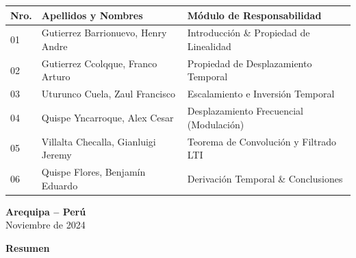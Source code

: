 \documentclass[11pt,a4paper]{article}
\begin{document}
\begin{titlepage}
  \begin{tcolorbox}[colback=slateLight,colframe=unsaBlue!80,arc=2mm,title=\textbf{Integrantes del Equipo de Investigaci\'on}]
    \small
    \begin{tabularx}{\linewidth}{l >{\raggedright\arraybackslash}X l}
      \textbf{Nro.} & \textbf{Apellidos y Nombres} & \textbf{M\'odulo de Responsabilidad} \\
      \midrule
      01 & Gutierrez Barrionuevo, Henry Andre & Introducci\'on \& Propiedad de Linealidad \\
      02 & Gutierrez Ccolqque, Franco Arturo & Propiedad de Desplazamiento Temporal \\
      03 & Uturunco Cuela, Zaul Francisco & Escalamiento e Inversi\'on Temporal \\
      04 & Quispe Yncarroque, Alex Cesar & Desplazamiento Frecuencial (Modulaci\'on) \\
      05 & Villalta Checalla, Gianluigi Jeremy & Teorema de Convoluci\'on y Filtrado LTI \\
      06 & Quispe Flores, Benjam\'in Eduardo & Derivaci\'on Temporal \& Conclusiones \\
      \bottomrule
    \end{tabularx}
  \end{tcolorbox}

  \vfill

  {\bfseries Arequipa -- Per\'u}\\
  {\small Noviembre de 2024}

\end{titlepage}

\newpage
\thispagestyle{plain}

\begin{center}
  {\Large\bfseries\color{unsaBlue} Resumen}
\end{center}
\vspace{0.2cm}
\end{document}
